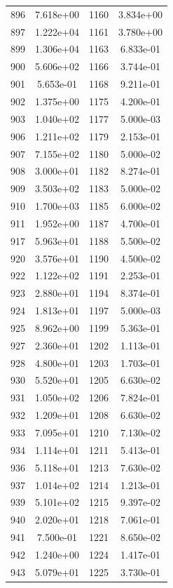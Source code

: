 \documentclass[12pt]{article}
\begin{document}
\begin{longtable}{@{}cccc@{}}
896 & 7.618e+00 & 1160 & 3.834e+00 \\
897 & 1.222e+04 & 1161 & 3.780e+00 \\
899 & 1.306e+04 & 1163 & 6.833e-01 \\
900 & 5.606e+02 & 1166 & 3.744e-01 \\
901 & 5.653e-01 & 1168 & 9.211e-01 \\
902 & 1.375e+00 & 1175 & 4.200e-01 \\
903 & 1.040e+02 & 1177 & 5.000e-03 \\
906 & 1.211e+02 & 1179 & 2.153e-01 \\
907 & 7.155e+02 & 1180 & 5.000e-02 \\
908 & 3.000e+01 & 1182 & 8.274e-01 \\
909 & 3.503e+02 & 1183 & 5.000e-02 \\
910 & 1.700e+03 & 1185 & 6.000e-02 \\
911 & 1.952e+00 & 1187 & 4.700e-01 \\
917 & 5.963e+01 & 1188 & 5.500e-02 \\
920 & 3.576e+01 & 1190 & 4.500e-02 \\
922 & 1.122e+02 & 1191 & 2.253e-01 \\
923 & 2.880e+01 & 1194 & 8.374e-01 \\
924 & 1.813e+01 & 1197 & 5.000e-03 \\
925 & 8.962e+00 & 1199 & 5.363e-01 \\
927 & 2.360e+01 & 1202 & 1.113e-01 \\
928 & 4.800e+01 & 1203 & 1.703e-01 \\
930 & 5.520e+01 & 1205 & 6.630e-02 \\
931 & 1.050e+02 & 1206 & 7.824e-01 \\
932 & 1.209e+01 & 1208 & 6.630e-02 \\
933 & 7.095e+01 & 1210 & 7.130e-02 \\
934 & 1.114e+01 & 1211 & 5.413e-01 \\
936 & 5.118e+01 & 1213 & 7.630e-02 \\
937 & 1.014e+02 & 1214 & 1.213e-01 \\
939 & 5.101e+02 & 1215 & 9.397e-02 \\
940 & 2.020e+01 & 1218 & 7.061e-01 \\
941 & 7.500e-01 & 1221 & 8.650e-02 \\
942 & 1.240e+00 & 1224 & 1.417e-01 \\
943 & 5.079e+01 & 1225 & 3.730e-01 \\

\bottomrule
\end{longtable}
\end{document}
